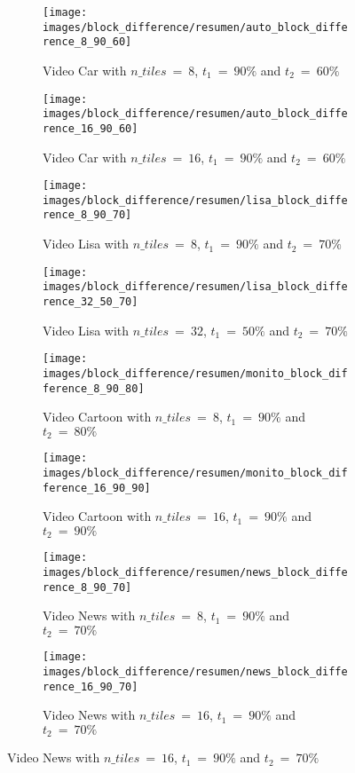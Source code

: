 \documentclass[journal]{IEEEtran}
\begin{document}
\begin{figure}
	\centering
	\begin{subfigure}{0.23\textwidth}
		\centering
		\texttt{[image: images/block\_difference/resumen/auto\_block\_difference\_8\_90\_60]} 
		\caption{Video Car with $n\_tiles~=~8$, $t_1~=~90\%$ and $t_2~=~60\%$}
		\label{fig:block_difference:resumen:auto_8_90_60} 
	\end{subfigure}
	\centering
	\begin{subfigure}{0.23\textwidth}
		\centering
		\texttt{[image: images/block\_difference/resumen/auto\_block\_difference\_16\_90\_60]}
		\caption{Video Car with $n\_tiles~=~16$, $t_1~=~90\%$ and $t_2~=~60\%$}
		\label{fig:block_difference:resumen:car_16_90_60}
	\end{subfigure}
	
	\centering
	\begin{subfigure}{0.23\textwidth}
		\centering
		\texttt{[image: images/block\_difference/resumen/lisa\_block\_difference\_8\_90\_70]} 
		\caption{Video Lisa with $n\_tiles~=~8$, $t_1~=~90\%$ and $t_2~=~70\%$}
		\label{fig:block_difference:resumen:lisa_8_90_70} 
	\end{subfigure}
	\centering
	\begin{subfigure}{0.23\textwidth}
		\centering
		\texttt{[image: images/block\_difference/resumen/lisa\_block\_difference\_32\_50\_70]}
		\caption{Video Lisa with $n\_tiles~=~32$, $t_1~=~50\%$ and $t_2~=~70\%$}
		\label{fig:block_difference:resumen:lisa_32_50_70}
	\end{subfigure}
	
	\centering
	\begin{subfigure}{0.23\textwidth}
		\centering
		\texttt{[image: images/block\_difference/resumen/monito\_block\_difference\_8\_90\_80]} 
		\caption{Video Cartoon with $n\_tiles~=~8$, $t_1~=~90\%$ and $t_2~=~80\%$}
		\label{fig:block_difference:resumen:cartoon_8_90_80} 
	\end{subfigure}
	\centering
	\begin{subfigure}{0.23\textwidth}
		\centering
		\texttt{[image: images/block\_difference/resumen/monito\_block\_difference\_16\_90\_90]}
		\caption{Video Cartoon with $n\_tiles~=~16$, $t_1~=~90\%$ and $t_2~=~90\%$}
		\label{fig:block_difference:resumen:cartoon_16_90_90}
	\end{subfigure}
	
	\centering
	\begin{subfigure}{0.23\textwidth}
		\centering
		\texttt{[image: images/block\_difference/resumen/news\_block\_difference\_8\_90\_70]} 
		\caption{Video News with $n\_tiles~=~8$, $t_1~=~90\%$ and $t_2~=~70\%$}
		\label{fig:block_difference:resumen:news_8_90_70} 
	\end{subfigure}
	\centering
	\begin{subfigure}{0.23\textwidth}
		\centering
		\texttt{[image: images/block\_difference/resumen/news\_block\_difference\_16\_90\_70]}
		\caption{Video News with $n\_tiles~=~16$, $t_1~=~90\%$ and $t_2~=~70\%$}
		\label{fig:block_difference:resumen:news_16_90_70}
	\end{subfigure}
	

\end{figure}
\end{document}
